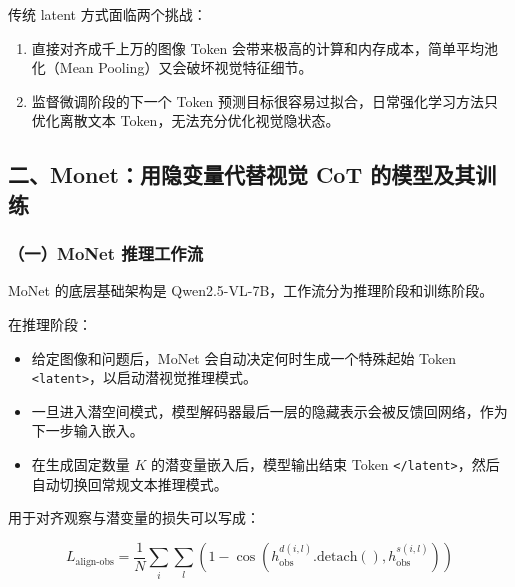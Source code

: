 传统 latent 方式面临两个挑战：

\begin{enumerate}
\def\labelenumi{\arabic{enumi}.}
\tightlist
\item
  直接对齐成千上万的图像 Token 会带来极高的计算和内存成本，简单平均池化（Mean Pooling）又会破坏视觉特征细节。
\item
  监督微调阶段的下一个 Token 预测目标很容易过拟合，日常强化学习方法只优化离散文本 Token，无法充分优化视觉隐状态。
\end{enumerate}

\hypertarget{ux4e8cmonetux7528ux9690ux53d8ux91cfux4ee3ux66ffux89c6ux89c9-cot-ux7684ux6a21ux578bux53caux5176ux8badux7ec3}{%
\subsection{二、Monet：用隐变量代替视觉 CoT 的模型及其训练}\label{ux4e8cmonetux7528ux9690ux53d8ux91cfux4ee3ux66ffux89c6ux89c9-cot-ux7684ux6a21ux578bux53caux5176ux8badux7ec3}}

\hypertarget{ux4e00monet-ux63a8ux7406ux5de5ux4f5cux6d41}{%
\subsubsection{（一）MoNet 推理工作流}\label{ux4e00monet-ux63a8ux7406ux5de5ux4f5cux6d41}}

MoNet 的底层基础架构是 Qwen2.5-VL-7B，工作流分为推理阶段和训练阶段。

在推理阶段：

\begin{itemize}
\tightlist
\item
  给定图像和问题后，MoNet 会自动决定何时生成一个特殊起始 Token \texttt{\textless{}latent\textgreater{}}，以启动潜视觉推理模式。
\item
  一旦进入潜空间模式，模型解码器最后一层的隐藏表示会被反馈回网络，作为下一步输入嵌入。
\item
  在生成固定数量 \(K\) 的潜变量嵌入后，模型输出结束 Token \texttt{\textless{}/latent\textgreater{}}，然后自动切换回常规文本推理模式。
\end{itemize}

用于对齐观察与潜变量的损失可以写成：

\[
L_{\text{align-obs}}
=\frac{1}{N}\sum_i\sum_l
\left(
1-\cos\left(h_{\text{obs}}^{d(i,l)}.\mathrm{detach}(),h_{\text{obs}}^{s(i,l)}\right)
\right)
\]

